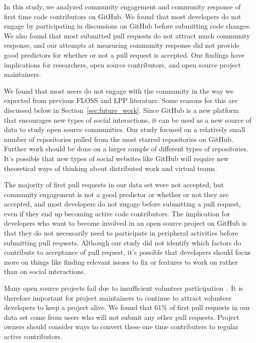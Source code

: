 \documentclass{sigchi}
\begin{document}
In this study, we analyzed community engagement and community response of first
time code contributors on GitHub. We found that most developers do not engage by
participating in discussions on GitHub before submitting code changes. We also
found that most submitted pull requests do not attract much community response,
and our attempts at measuring community response did not provide good predictors
for whether or not a pull request is accepted. Our findings have implications
for researchers, open source contributors, and open source project maintainers.

We found that most users do not engage with the community in the way we expected
from previous FLOSS and LPP literature. Some reasons for this are discussed
below in Section~\ref{sec:future_work}. Since GitHub is a new platform that
encourages new types of social interactions, it can be used as a new source of
data to study open source communities. Our study focused on a relatively small
number of repositories pulled from the most starred repositories on GitHub.
Further work should be done on a larger sample of different types of
repositories. It's possible that new types of social websites like GitHub will
require new theoretical ways of thinking about distributed work and virtual
teams.

The majority of first pull requests in our data set were not accepted, but
community engagement is not a good predictor or whether or not they are
accepted, and most developers do not engage before submitting a pull request,
even if they end up becoming active code contributors. The implication for
developers who want to become involved in an open source project on GitHub is
that they do not necessarily need to participate in peripheral activities before
submitting pull requests. Although our study did not identify which factors do
contribute to acceptance of pull request, it's possible that developers should
focus more on things like finding relevant issues to fix or features to work on
rather than on social interactions.

Many open source projects fail due to insufficient volunteer
participation~\cite{crowston_defining_2003,krishnamurthy_cave_2002}. It
is therefore important for project maintainers to continue to attract volunteer
developers to keep a project alive. We found that 61\% of first pull requests in
our data set come from users who will not submit any other pull requests.
Project owners should consider ways to convert these one time contributers to
regular active contributors.
\end{document}
